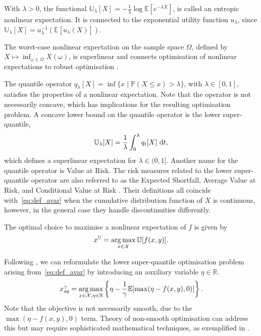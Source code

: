 \documentclass[main.tex]{subfiles}
\begin{document}
\begin{example}
  With $\lambda>0$, the functional
  $\mathbb{U}_\lambda[X]=-\frac{1}{\lambda}\log\mathbb{E}[e^{-\lambda
    X}]$, is called an entropic nonlinear expectation.
  It is connected to the exponential utility function $u_\lambda$, since
  $\mathbb{U}_\lambda[X]= u_\lambda^{-1}(\mathbb{E}[u_\lambda(X)])$.

  The worst-case nonlinear expectation on the sample space $\Omega$,
  defined by
  $X\mapsto  \inf_{\omega\in\Omega}X(\omega)$, is superlinear and
  connects optimisation of nonlinear expectations to robust optimisation \citep{ben2009robust}.

  The quantile operator
  $q_\lambda[X] = \inf\{x\mid\mathbb{P}(X\leq x)>
  \lambda\}$, with $\lambda\in[0,1]$, satisfies the properties of a
  nonlinear expectation.
  Note that the operator is not necessarily concave, which has
  implications for the resulting optimisation problem.
  A concave lower bound on the quantile operator is
  the lower super-quantile,
  \begin{equation}\label{eq:def_avar}
    \mathbb{U}_\lambda[X]=\frac{1}{\lambda}\int_0^\lambda q_t[X]\,\,\mathrm{d}t,
  \end{equation}
  which defines a superlinear expectation for $\lambda\in(0,1]$.
  Another name for the quantile operator is Value at Risk.
  The risk measures related to the lower super-quantile operator are also referred to as
  the Expected Shortfall, Average Value at Risk, and Conditional Value at Risk
  \citep{artzner1999coherent,rockafellar2002conditional,follmer2004stochastic,rockafellar2013fundamental}.
  Their definitions all coincide with~\eqref{eq:def_avar} when the
  cumulative distribution function of $X$ is continuous, however, in
  the general case they handle discontinuities differently.
\end{example}


\begin{problem}
  The optimal choice to maximise a nonlinear expectation
  of $f$ is given by
  \begin{align}
    x^{\mathbb{U}}=\operatorname*{arg\,max}_{x\in\mathcal{X}} \mathbb{U}[f(x,y)].
  \end{align}
\end{problem}

\begin{example}
  Following \citet{ben2007old}, we can reformulate the lower
  super-quantile optimisation problem arising from~\eqref{eq:def_avar}
  by introducing an auxiliary variable $\eta\in\mathbb{R}$.
  \begin{equation}\label{eq:opt_avar}
    x_{sq}^{\gamma}
    =\operatorname*{arg\,max}_{x\in\mathcal{X},\eta\in\mathbb{R}}
    \left\{\eta - \frac{1}{\gamma}\mathbb{E}[\max(\eta-f(x,y),0)]\right\}.
  \end{equation}
  Note that the objective is not necessarily smooth, due to the
  $\max(\eta-f(x,y),0)$ term. Theory of non-smooth optimisation
  can address this but may require sophisticated mathematical techniques, as
  exemplified in \citep{kouri2016risk}.
\end{example}
\end{document}
